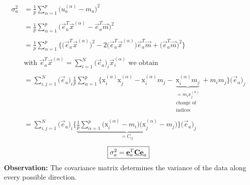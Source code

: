 \begin{equation} \tag{variance}
	\begin{array}{ll}
	\sigma_a^2 
	& = \frac{1}{p} \sum\limits_{\alpha = 1}^p \Big( u_a^{(\alpha)} - m_a
		\Big)^2 \\\\
	& = \frac{1}{p} \sum\limits_{\alpha = 1}^p \Big( \vec{e}_a^T
		\vec{x}^{(\alpha)} - \vec{e}_a^T \vec{m} \Big)^2 \\\\
	& = \frac{1}{p} \sum\limits_{\alpha = 1}^p \bigg\{
		\Big( \vec{e}_a^T \vec{x}^{(\alpha)} \Big)^2
		- 2 \Big( \vec{e}_a^T \vec{x}^{(\alpha)} \Big) \vec{e}_a^T
		\vec{m} + \Big( \vec{e}_a^T \vec{m} \Big)^2
		\bigg\} \\\\
	& \text{with } \vec{e}_a^T \vec{x}^{(\alpha)} = \sum\limits_{i = 1}^N
		\big( \vec{e}_a \big)_i \vec{x}_i^{(\alpha)} \text{ we obtain}
		\\\\
	& = \sum\limits_{i,j = 1}^N \big( \vec{e}_a \big)_i \frac{1}{p}
		\sum\limits_{\alpha = 1}^p \bigg\{ \mathrm{x}_i^{(\alpha)}
			\mathrm{x}_j^{(\alpha)} - \mathrm{x}_i^{(\alpha)}
			m_j - \underbrace{ \mathrm{x}_i^{(\alpha)} m_j }_{
				\substack{ = m_i x_j^{(\alpha)} \\
					\text{change of} \\
					\text{indices}} }
			+ m_i m_j \bigg\} \big( \vec{e}_a \big)_j \\\\
	& = \sum\limits_{i,j = 1}^N \big( \vec{e}_a \big)_i \bigg\{
		\underbrace{ \frac{1}{p} \sum\limits_{\alpha = 1}^p
		\Big( \mathrm{x}_i^{(\alpha)} - m_i \Big) \Big(
		\mathrm{x}_j^{(\alpha)} - m_j \Big) }_{
			= C_{ij} } \bigg\} \big( \vec{e}_a \big)_j
	\end{array}
\end{equation}
\begin{equation}
	\fbox{$ \sigma_a^2 = \vec{e}_a^T \vec{C} \vec{e}_a
	$}
\end{equation}
\textbf{Observation:} The covariance matrix determines the variance of
the data along every possible direction.


